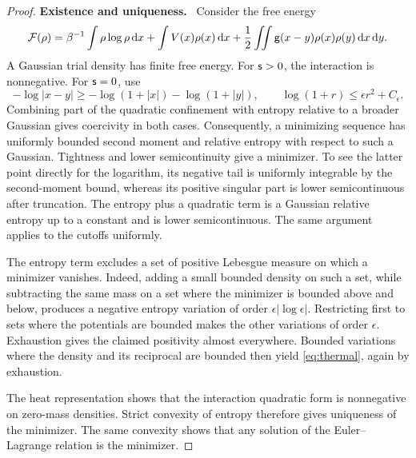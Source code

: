 \documentclass[11pt,reqno]{amsart}
\numberwithin{equation}{section}
\theoremstyle{plain}
\theoremstyle{remark}
\newcommand{\parheading}[1]{\par\medskip\noindent\textbf{#1}\ }
\begin{document}
\begin{proof}
\parheading{Existence and uniqueness.}
Consider the free energy
\begin{equation}\label{eq:meanfield-freeenergy}
 \mathcal F(\rho)=\beta^{-1}\int\rho\log\rho\,\mathrm d x
              +\int V(x)\rho(x)\,\mathrm d x
              +\frac12\iint\mathsf g(x-y)\rho(x)\rho(y)\,\mathrm d x\,\mathrm d y.
\end{equation}
A Gaussian trial density has finite free energy. For $\mathsf{s}>0$, the interaction is nonnegative. For $\mathsf{s}=0$, use
\begin{equation}\label{eq:thermal-log-lower}
 -\log|x-y|\ge-\log(1+|x|)-\log(1+|y|),
 \qquad \log(1+r)\le\epsilon r^2+C_\epsilon.
\end{equation}
Combining part of the quadratic confinement with entropy relative to a broader Gaussian gives coercivity in both cases. Consequently, a minimizing sequence has uniformly bounded second moment and relative entropy with respect to such a Gaussian. Tightness and lower semicontinuity give a minimizer. To see the latter point directly for the logarithm, its negative tail is uniformly integrable by the second-moment bound, whereas its positive singular part is lower semicontinuous after truncation. The entropy plus a quadratic term is a Gaussian relative entropy up to a constant and is lower semicontinuous. The same argument applies to the cutoffs uniformly.

The entropy term excludes a set of positive Lebesgue measure on which a minimizer vanishes. Indeed, adding a small bounded density on such a set, while subtracting the same mass on a set where the minimizer is bounded above and below, produces a negative entropy variation of order $\epsilon|\log\epsilon|$. Restricting first to sets where the potentials are bounded makes the other variations of order $\epsilon$. Exhaustion gives the claimed positivity almost everywhere. Bounded variations where the density and its reciprocal are bounded then yield \eqref{eq:thermal}, again by exhaustion.

The heat representation shows that the interaction quadratic form is nonnegative on zero-mass densities. Strict convexity of entropy therefore gives uniqueness of the minimizer. The same convexity shows that any solution of the Euler--Lagrange relation is the minimizer.


\end{proof}
\end{document}
